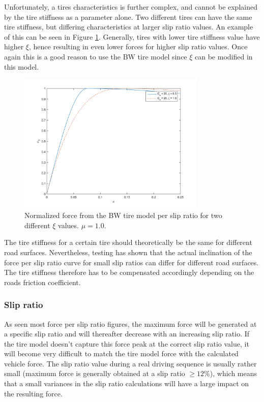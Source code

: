 Unfortunately, a tires characteristics is further complex, and cannot be explained by the tire stiffness as a parameter alone. Two different tires can have the same tire stiffness, but differing characteristics at larger slip ratio values. An example of this can be seen in Figure \ref{different_xsi}. Generally, tires with lower tire stiffness value have higher $ \xi $, hence resulting in even lower forces for higher slip ratio values. Once again this is a good reason to use the BW tire model since $ \xi $ can be modified in this model.

\begin{figure}[h]
	\centering
	\includegraphics[width=0.8\textwidth]{Pictures/slipkraft_olika_xsi}
	\caption {Normalized force from the BW tire model per slip ratio for two different $ \xi $ values. $ \mu = 1.0 $.}
	\label{different_xsi}
\end{figure}

The tire stiffness for a certain tire should theoretically be the same for different road surfaces. Nevertheless, testing has shown that the actual inclination of the force per slip ratio curve for small slip ratios can differ for different road surfaces. The tire stiffness therefore has to be compensated accordingly depending on the roads friction coefficient.

\subsubsection{Slip ratio}
As seen most force per slip ratio figures, the maximum force will be generated at a specific slip ratio and will thereafter decrease with an increasing slip ratio. If the tire model doesn't capture this force peak at the correct slip ratio value, it will become very difficult to match the tire model force with the calculated vehicle force. The slip ratio value during a real driving sequence is usually rather small (maximum force is generally obtained at a slip ratio $ \geq 12 \% $), which means that a small variances in the slip ratio calculations will have a large impact on the resulting force.

